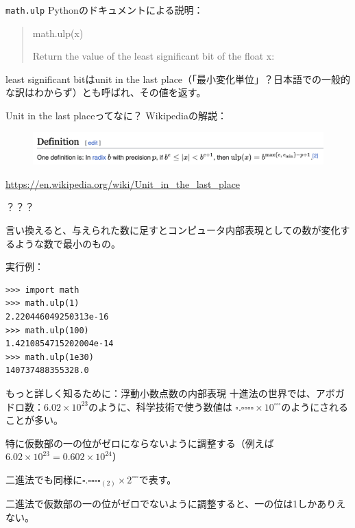 \documentclass[unicode,lualatex,aspectratio=169]{beamer}
\begin{document}
\begin{frame}[fragile]{{\tt math.ulp}}
  Pythonのドキュメントによる説明：
  {\small
  \begin{quote}
    \noindent math.ulp(x)
    
    \hspace{3mm}Return the value of the least significant bit of the float x:
  \end{quote}
}

least significant bitはunit in the last place（「最小変化単位」？日本語での一般的な訳はわからず）とも呼ばれ、その値を返す。
\end{frame}
\begin{frame}[fragile]{Unit in the last placeってなに？}
Wikipediaの解説：
\begin{figure}[!ht]
\includegraphics[scale=.4]{img/wikipedia-ulp.png}
\end{figure}
{\tiny \url{https://en.wikipedia.org/wiki/Unit\_in\_the\_last\_place}}

？？？

言い換えると、与えられた数に足すとコンピュータ内部表現としての数が変化するような数で最小のもの。

実行例：
{\fontsize{6pt}{6pt}\selectfont    
\begin{verbatim}
>>> import math
>>> math.ulp(1)
2.220446049250313e-16
>>> math.ulp(100)
1.4210854715202004e-14
>>> math.ulp(1e30)
140737488355328.0
\end{verbatim}
}
\end{frame}
\begin{frame}[fragile]{もっと詳しく知るために：浮動小数点数の内部表現}
  十進法の世界では、アボガドロ数：$6.02\times 10^{23}$のように、科学技術で使う数値は
  $\square.\square\square\square\square \times 10^{\square\square\square}$のようにされることが多い。

  特に仮数部の一の位がゼロにならないように調整する（例えば$6.02\times 10^{23} =
  0.602 \times 10^{24}$）
  
  二進法でも同様に$\square.\square\square\square\square_{(2)} \times 2^{\square\square\square}$で表す。

  二進法で仮数部の一の位がゼロでないように調整すると、一の位は1しかありえない。

\end{frame}
\end{document}

